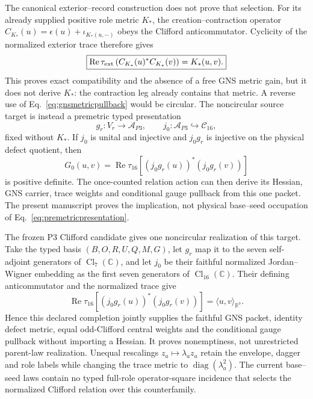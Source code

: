 The canonical exterior--record construction does not prove that selection.
For its already supplied positive role metric $K_*$, the
creation--contraction operator
$C_{K_*}(u)=\epsilon(u)+\iota_{K_*(u,-)}$ obeys the Clifford
anticommutator.  Cyclicity of the normalized exterior trace therefore gives
\begin{equation}
\boxed{
\operatorname{Re}\tau_{\rm ext}
 \left(C_{K_*}(u)^*C_{K_*}(v)\right)=K_*(u,v).}
\label{eq:gnsmetricpullback}
\end{equation}
This proves exact compatibility and the absence of a free GNS metric gain,
but it does not derive $K_*$: the contraction leg already contains that
metric.  A reverse use of Eq.~\eqref{eq:gnsmetricpullback} would be circular.
The noncircular source target is instead a premetric typed presentation
\begin{equation}
g_r:V_r\longrightarrow\mathcal A_{P3},\qquad
j_0:\mathcal A_{P3}\hookrightarrow\mathcal C_{16},
\label{eq:premetricpresentation}
\end{equation}
fixed without $K_*$.  If $j_0$ is unital and injective and $j_0g_r$ is
injective on the physical defect quotient, then
\begin{equation}
G_0(u,v)=\operatorname{Re}\tau_{16}
 \left[(j_0g_r(u))^*(j_0g_r(v))\right]
\label{eq:premetricpullback}
\end{equation}
is positive definite.  The once-counted relation action can then derive its
Hessian, GNS carrier, trace weights and conditional gauge pullback from this
one packet.  The present manuscript proves the implication, not physical
base--seed occupation of Eq.~\eqref{eq:premetricpresentation}.

The frozen P3 Clifford candidate gives one noncircular realization of this
target.  Take the typed basis $(B,O,R,U,Q,M,G)$, let $g_r$ map it to the
seven self-adjoint generators of $\operatorname{Cl}_7(\mathbb C)$, and let
$j_0$ be their faithful normalized Jordan--Wigner embedding as the first
seven generators of $\operatorname{Cl}_{16}(\mathbb C)$.  Their defining
anticommutator and the normalized trace give
\begin{equation}
\operatorname{Re}\tau_{16}
 \left[(j_0g_r(u))^*(j_0g_r(v))\right]
=\langle u,v\rangle_{\mathbb R^7}.
\label{eq:premetricclifford}
\end{equation}
Hence this declared completion jointly supplies the faithful GNS packet,
identity defect metric, equal odd-Clifford central weights and the
conditional gauge pullback without importing a Hessian.  It proves
nonemptiness, not unrestricted parent-law realization.  Unequal rescalings
$z_a\mapsto\lambda_a z_a$ retain the envelope, dagger and role labels while
changing the trace metric to $\operatorname{diag}(\lambda_a^2)$.  The current
base--seed laws contain no typed full-role operator-square incidence that
selects the normalized Clifford relation over this counterfamily.

